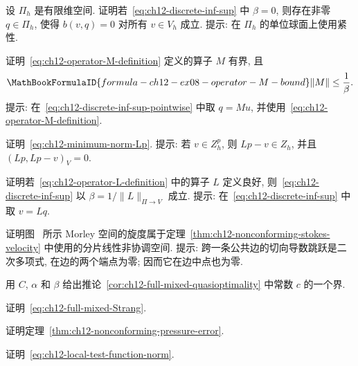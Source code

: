 \begin{MBExercise}
\label{exr:ch12-finite-dimensional-inf-sup-nullspace}
设 $\Pi_h$ 是有限维空间. 证明若~\eqref{eq:ch12-discrete-inf-sup} 中 $\beta=0$, 则存在非零 $q\in\Pi_h$, 使得
$b(v,q)=0$ 对所有 $v\in V_h$ 成立. 提示: 在 $\Pi_h$ 的单位球面上使用紧性.
\end{MBExercise}

\begin{MBExercise}
\label{exr:ch12-operator-M-bound}
证明~\eqref{eq:ch12-operator-M-definition} 定义的算子 $M$ 有界, 且
\[
\MathBookFormulaID{formula-ch12-ex08-operator-M-bound}
\|M\|\leq\frac1\beta.
\]
提示: 在~\eqref{eq:ch12-discrete-inf-sup-pointwise} 中取 $q=Mu$, 并使用~\eqref{eq:ch12-operator-M-definition}.
\end{MBExercise}

\begin{MBExercise}
\label{exr:ch12-minimum-norm-Lp}
证明~\eqref{eq:ch12-minimum-norm-Lp}. 提示: 若 $v\in Z_h^p$, 则 $Lp-v\in Z_h$, 并且 $(Lp,Lp-v)_V=0$.
\end{MBExercise}

\begin{MBExercise}
\label{exr:ch12-operator-equivalence-converse}
证明若~\eqref{eq:ch12-operator-L-definition} 中的算子 $L$ 定义良好, 则~\eqref{eq:ch12-discrete-inf-sup} 以 $\beta=1/\|L\|_{\Pi\to V}$ 成立. 提示: 在~\eqref{eq:ch12-discrete-inf-sup} 中取 $v=Lq$.
\end{MBExercise}

\begin{MBExercise}
\label{exr:ch12-curl-Morley-inclusion}
证明图~ 所示 Morley 空间的旋度属于定理~\ref{thm:ch12-nonconforming-stokes-velocity} 中使用的分片线性非协调空间. 提示: 跨一条公共边的切向导数跳跃是二次多项式, 在边的两个端点为零; 因而它在边中点也为零.
\end{MBExercise}

\begin{MBExercise}
\label{exr:ch12-full-mixed-constant-bound}
用 $C$, $\alpha$ 和 $\beta$ 给出推论~\ref{cor:ch12-full-mixed-quasioptimality} 中常数 $c$ 的一个界.
\end{MBExercise}

\begin{MBExercise}
\label{exr:ch12-full-mixed-strang}
证明~\eqref{eq:ch12-full-mixed-Strang}.
\end{MBExercise}

\begin{MBExercise}
\label{exr:ch12-nonconforming-pressure-error}
证明定理~\ref{thm:ch12-nonconforming-pressure-error}.
\end{MBExercise}

\begin{MBExercise}
\label{exr:ch12-local-test-function-norm}
证明~\eqref{eq:ch12-local-test-function-norm}.
\end{MBExercise}
